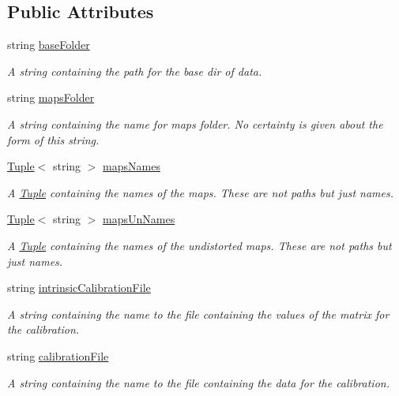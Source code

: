 \subsection*{Public Attributes}
\begin{DoxyCompactItemize}
\item 
string \mbox{\hyperlink{class_settings_ae48d5bd7db6c75ba5c697e08e4b32cee}{base\+Folder}}
\begin{DoxyCompactList}\small\item\em A string containing the path for the base dir of data. \end{DoxyCompactList}\item 
string \mbox{\hyperlink{class_settings_aeddfd4457036a14cb0a48d50d9e6ccfe}{maps\+Folder}}
\begin{DoxyCompactList}\small\item\em A string containing the name for maps folder. No certainty is given about the form of this string. \end{DoxyCompactList}\item 
\mbox{\hyperlink{class_tuple}{Tuple}}$<$ string $>$ \mbox{\hyperlink{class_settings_a4a464c938e96639861dc2deb773a2fb8}{maps\+Names}}
\begin{DoxyCompactList}\small\item\em A \mbox{\hyperlink{class_tuple}{Tuple}} containing the names of the maps. These are not paths but just names. \end{DoxyCompactList}\item 
\mbox{\hyperlink{class_tuple}{Tuple}}$<$ string $>$ \mbox{\hyperlink{class_settings_a1866d578ad33e56429a88617a655f9c6}{maps\+Un\+Names}}
\begin{DoxyCompactList}\small\item\em A \mbox{\hyperlink{class_tuple}{Tuple}} containing the names of the undistorted maps. These are not paths but just names. \end{DoxyCompactList}\item 
string \mbox{\hyperlink{class_settings_a634e9900615e8d5b46b08e0fc86d67a5}{intrinsic\+Calibration\+File}}
\begin{DoxyCompactList}\small\item\em A string containing the name to the file containing the values of the matrix for the calibration. \end{DoxyCompactList}\item 
string \mbox{\hyperlink{class_settings_ac6ff9ca8d90b9e43e26c069c88b7c699}{calibration\+File}}
\begin{DoxyCompactList}\small\item\em A string containing the name to the file containing the data for the calibration. \end{DoxyCompactList}\item 

\end{DoxyCompactItemize}
